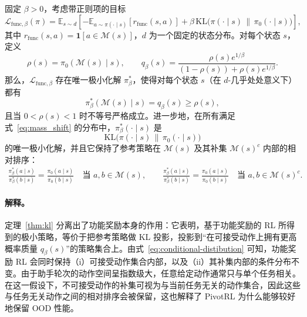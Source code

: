 \begin{theorem}
\label{thm:kl}
固定 $\beta>0$，考虑带正则项的目标
\begin{equation}
\mathcal{L}_{\mathrm{func},\beta}(\pi)
=
\mathbb{E}_{s\sim d}
\left[
-
\mathbb{E}_{a\sim\pi(\cdot\mid s)}[r_{\mathrm{func}}(s,a)]
+
\beta\,\mathrm{KL}\!\bigl(\pi(\cdot\mid s)\,\|\,\pi_0(\cdot\mid s)\bigr)
\right],
\label{eq:kl_obj}
\end{equation}
其中 $r_{\mathrm{func}}(s,a)=\mathbf{1}[a\in \mathcal{M}(s)]$，$d$ 为一个固定的状态分布。对每个状态 $s$，定义
\begin{equation}
\rho(s)=\pi_0(\mathcal{M}(s)\mid s),
\qquad
q_\beta(s)
=
\frac{\rho(s)e^{1/\beta}}{(1-\rho(s))+\rho(s)e^{1/\beta}}.
\label{eq:qbeta}
\end{equation}
那么，$\mathcal{L}_{\mathrm{func},\beta}$ 存在唯一极小化解 $\pi_\beta^*$，使得对每个状态 $s$（在 $d$-几乎处处意义下）都有
\begin{equation}
\pi_\beta^*(\mathcal{M}(s)\mid s)=q_\beta(s)\ge \rho(s),
\label{eq:mass_shift}
\end{equation}
且当 $0<\rho(s)<1$ 时不等号严格成立。进一步地，在所有满足式~\eqref{eq:mass_shift} 的分布中，$\pi_\beta^*(\cdot\mid s)$ 是
\[
\mathrm{KL}\!\bigl(\pi(\cdot\mid s)\,\|\,\pi_0(\cdot\mid s)\bigr)
\]
的唯一极小化解，并且它保持了参考策略在 $\mathcal{M}(s)$ 及其补集 $\mathcal{M}(s)^c$ 内部的相对排序：
\begin{align}
\label{eq:conditional-distibution}
\frac{\pi_\beta^*(a\mid s)}{\pi_\beta^*(b\mid s)}
=
\frac{\pi_0(a\mid s)}{\pi_0(b\mid s)}
\quad
\text{当 } a,b\in \mathcal{M}(s),
\qquad
\frac{\pi_\beta^*(a\mid s)}{\pi_\beta^*(b\mid s)}
=
\frac{\pi_0(a\mid s)}{\pi_0(b\mid s)}
\quad
\text{当 } a,b\in \mathcal{M}(s)^c.
\end{align}
\end{theorem}

\paragraph{解释。}
定理~\ref{thm:kl} 分离出了功能奖励本身的作用：它表明，基于功能奖励的 RL 所得到的极小策略，等价于把参考策略做 KL 投影，投影到“在可接受动作上拥有更高概率质量 $q_\beta(s)$”的策略集合上。由式~\eqref{eq:conditional-distibution} 可知，功能奖励 RL 会同时保持（i）可接受动作集合内部，以及（ii）其补集内部的条件分布不变。由于助手轮次的动作空间呈指数级大，任意给定动作通常只与单个任务相关。在这一假设下，不可接受动作的补集可视为与当前任务无关的动作集合，因此这些与任务无关动作之间的相对排序会被保留，这也解释了 PivotRL 为什么能够较好地保留 OOD 性能。
